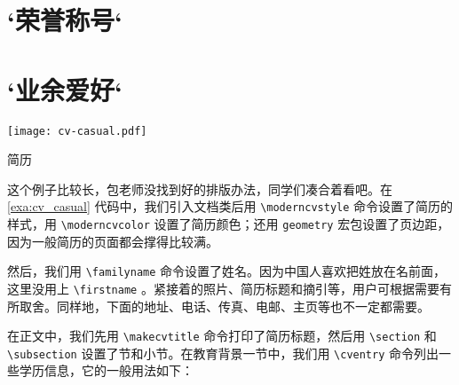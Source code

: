 \begin{Code}[numbers=left, firstnumber=last]
\section{`荣誉称号`}

\section{`业余爱好`}

\end{Code}

\begin{example}[htbp]
  \begin{Demo}
  \centering
  \texttt{[image: cv-casual.pdf]}
  \end{Demo}
\end{example}

\begin{example}[htbp]
  \begin{Demo}
  \centering
  \end{Demo}
  \caption{简历}
  \label{exa:cv_casual}
\end{example}
  
这个例子比较长，包老师没找到好的排版办法，同学们凑合着看吧。在 \autoref{exa:cv_casual} 代码中，我们引入文档类后用 \verb|\moderncvstyle| 命令设置了简历的样式，用 \verb|\moderncvcolor| 设置了简历颜色；还用 \texttt{geometry} 宏包设置了页边距，因为一般简历的页面都会撑得比较满。

然后，我们用 \verb|\familyname| 命令设置了姓名。因为中国人喜欢把姓放在名前面，这里没用上 \verb|\firstname| 。紧接着的照片、简历标题和摘引等，用户可根据需要有所取舍。同样地，下面的地址、电话、传真、电邮、主页等也不一定都需要。

在正文中，我们先用 \verb|\makecvtitle| 命令打印了简历标题，然后用 \verb|\section| 和 \verb|\subsection| 设置了节和小节。在教育背景一节中，我们用 \verb|\cventry| 命令列出一些学历信息，它的一般用法如下：

